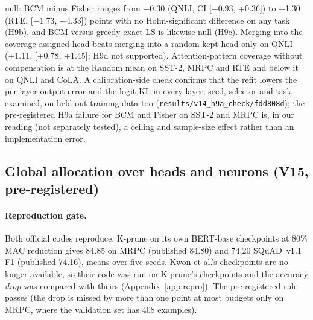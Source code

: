 \documentclass[11pt]{article}
\begin{document}
null: BCM minus Fisher ranges from $-0.30$ (QNLI, CI [$-0.93$, +0.36]) to +1.30 (RTE, [$-1.73$, +4.33]) points with no
Holm-significant difference on any task (H9b), and BCM versus greedy exact LS is likewise null (H9c). Merging into the
coverage-assigned head beats merging into a random kept head only on QNLI (+1.11, [+0.78, +1.45]; H9d not supported).
Attention-pattern coverage without compensation is at the Random mean on SST-2, MRPC and RTE and below it on QNLI and
CoLA. A calibration-side check confirms that the refit lowers the per-layer output error and the logit KL in every
layer, seed, selector and task examined, on held-out training data too (\texttt{results/v14\_h9a\_check/fdd808d}); the
pre-registered H9a failure for BCM and Fisher on SST-2 and MRPC is, in our reading (not separately tested), a ceiling and sample-size effect rather than an
implementation error.

\subsection{Global allocation over heads and neurons (V15, pre-registered)}\label{sec:v15}
\paragraph{Reproduction gate.} Both official codes reproduce. K-prune on its own BERT-base checkpoints at 80\% MAC
reduction gives 84.85 on MRPC (published 84.80) and 74.20 SQuAD~v1.1 F1 (published 74.16), means over five seeds.
Kwon et al.'s checkpoints are no longer available, so their code was run on K-prune's checkpoints and the accuracy
\emph{drop} was compared with theirs (Appendix~\ref{app:repro}). The pre-registered rule passes (the drop is missed by
more than one point at most budgets only on MRPC, where the validation set has 408 examples).
\end{document}
